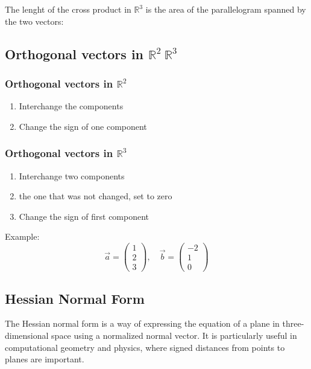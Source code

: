 \noindent The lenght of the cross product in $\mathbb{R}^3$ is the area of the parallelogram spanned by the two vectors:

\subsection{Orthogonal vectors in \texorpdfstring{$\mathbb{R}^2\ \mathbb{R}^3$}{}}

\subsubsection{Orthogonal vectors in \texorpdfstring{$\mathbb{R}^2$}{}}

\begin{enumerate}[label=(\roman*)]
	\item Interchange the components
	\item Change the sign of one component
\end{enumerate}

\subsubsection{Orthogonal vectors in \texorpdfstring{$\mathbb{R}^3$}{}}
\begin{enumerate}[label=(\roman*)]
	\item Interchange two components
	\item the one that was not changed, set to zero
	\item Change the sign of first component
\end{enumerate}
\noindent Example:
\[
	\vec{a} = \begin{pmatrix} 1 \\ 2 \\ 3 \end{pmatrix}, \quad \vec{b} = \begin{pmatrix} -2 \\ 1 \\ 0 \end{pmatrix}
\]

\subsection{Hessian Normal Form}

The Hessian normal form is a way of expressing the equation of a plane in three-dimensional space using a normalized normal vector. It is particularly useful in computational geometry and physics, where signed distances from points to planes are important.

